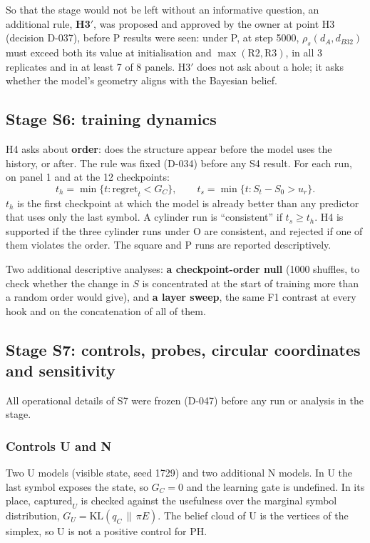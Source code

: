 \documentclass[12pt,a4paper]{article}
\newcommand{\en}[1]{\foreignlanguage{english}{#1}}   %
\newcommand{\GC}{G_{C}}
\newcommand{\KL}{\mathrm{KL}}
\begin{document}
So that the stage would not be left without an informative question, an additional rule, \textbf{H3$'$}, was proposed and approved by the owner at point H3 (decision \en{D-037}), before P results were seen: under P, at step 5000, $\rho_s(d_A,d_{B32})$ must exceed both its value at initialisation and $\max(\mathrm{R2},\mathrm{R3})$, in all 3 replicates and in at least 7 of 8 panels. H3$'$ does not ask about a hole; it asks whether the model's geometry aligns with the Bayesian belief.

\subsection{Stage S6: training dynamics}
H4 asks about \textbf{order}: does the structure appear before the model uses the history, or after. The rule was fixed (\en{D-034}) before any S4 result. For each run, on panel 1 and at the 12 checkpoints:
\begin{equation}
t_h=\min\{t:\mathrm{regret}_t<\GC\},\qquad t_s=\min\{t:S_t-S_0>u_r\}.
\end{equation}
$t_h$ is the first checkpoint at which the model is already better than any predictor that uses only the last symbol. A cylinder run is ``consistent'' if $t_s\ge t_h$. H4 is supported if the three cylinder runs under O are consistent, and rejected if one of them violates the order. The square and P runs are reported descriptively.

Two additional descriptive analyses: \textbf{a checkpoint-order \en{null}} (1000 shuffles, to check whether the change in $S$ is concentrated at the start of training more than a random order would give), and \textbf{a layer sweep}, the same F1 contrast at every \en{hook} and on the concatenation of all of them.

\subsection{Stage S7: controls, \en{probes}, circular coordinates and sensitivity}
All operational details of S7 were frozen (\en{D-047}) before any run or analysis in the stage.

\subsubsection{Controls U and N}
Two U models (visible state, seed 1729) and two additional N models. In U the last symbol exposes the state, so $\GC=0$ and the learning gate is undefined. In its place, $\mathrm{captured}_U$ is checked against the usefulness over the marginal symbol distribution, $G_U=\KL(q_C\,\|\,\pi E)$. The belief cloud of U is the vertices of the simplex, so U is not a positive control for PH.
\end{document}
